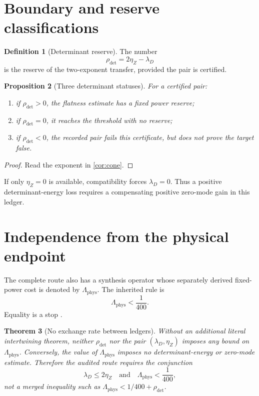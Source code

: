 \documentclass[11pt,a4paper]{article}
\newtheorem{theorem}{Theorem}[section]
\newtheorem{proposition}[theorem]{Proposition}
\theoremstyle{definition}
\newtheorem{definition}[theorem]{Definition}
\theoremstyle{remark}
\newcommand{\Lam}{\Lambda_{\mathrm{phys}}}
\begin{document}
\section{Boundary and reserve classifications}

\begin{definition}[Determinant reserve]
The number
\[
 \rho_{\mathrm{det}}=2\eta_Z-\lambda_D
\]
is the reserve of the two-exponent transfer, provided the pair is
certified.
\end{definition}

\begin{proposition}[Three determinant statuses]
\label{prop:statuses}
For a certified pair:
\begin{enumerate}[label=(\roman*),leftmargin=2.2em]
\item if \(\rho_{\mathrm{det}}>0\), the flatness estimate has a fixed
power reserve;
\item if \(\rho_{\mathrm{det}}=0\), it reaches the threshold with no
reserve;
\item if \(\rho_{\mathrm{det}}<0\), the recorded pair fails this
certificate, but does not prove the target false.
\end{enumerate}
\end{proposition}

\begin{proof}
Read the exponent in \cref{cor:cone}.
\end{proof}

If only \(\eta_Z=0\) is available, compatibility forces
\(\lambda_D=0\).  Thus a positive determinant-energy loss requires
a compensating positive zero-mode gain in this ledger.

\section{Independence from the physical endpoint}

The complete route also has a synthesis operator whose separately
derived fixed-power cost is denoted by \(\Lam\).  The inherited rule
is
\[
 \boxed{\Lam<\frac1{400}.}
\]
Equality is a stop \citep{WangTPC82,WangTPC92,WangMVP1}.

\begin{theorem}[No exchange rate between ledgers]
\label{thm:independence}
Without an additional literal intertwining theorem, neither
\(\rho_{\mathrm{det}}\) nor the pair
\((\lambda_D,\eta_Z)\) imposes any bound on \(\Lam\).  Conversely,
the value of \(\Lam\) imposes no determinant-energy or zero-mode
estimate.  Therefore the audited route requires the conjunction
\[
 \boxed{
 \lambda_D\le2\eta_Z
 \quad\text{and}\quad
 \Lam<\frac1{400},}
\]
not a merged inequality such as
\(\Lam<1/400+\rho_{\mathrm{det}}\).
\end{theorem}
\end{document}
